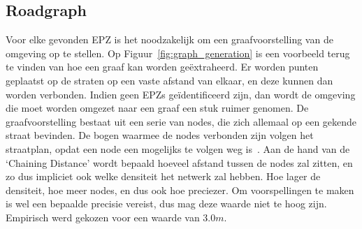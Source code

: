 \subsection{Roadgraph}\label{sec:roadgraph}
Voor elke gevonden EPZ is het noodzakelijk om een graafvoorstelling van de
omgeving op te stellen. Op Figuur~\ref{fig:graph_generation} is een voorbeeld
terug te vinden van hoe een graaf kan worden geëxtraheerd. Er worden punten
geplaatst op de straten op een vaste afstand van elkaar, en deze kunnen dan
worden verbonden. Indien geen \acp{EPZ} geïdentificeerd zijn, dan wordt de
omgeving die moet worden omgezet naar een graaf een stuk ruimer genomen. De
graafvoorstelling bestaat uit een serie van nodes, die zich allemaal op een
gekende straat bevinden. De bogen waarmee de nodes verbonden zijn volgen het
straatplan, opdat een node een mogelijks te volgen weg
is~\cite{neira2022graph}. Aan de hand van de `Chaining Distance' wordt bepaald
hoeveel afstand tussen de nodes zal zitten, en zo dus impliciet ook welke
densiteit het netwerk zal hebben. Hoe lager de densiteit, hoe meer nodes, en
dus ook hoe preciezer. Om voorspellingen te maken is wel een bepaalde precisie
vereist, dus mag deze waarde niet te hoog zijn. Empirisch werd gekozen voor een
waarde van $3.0m$.

